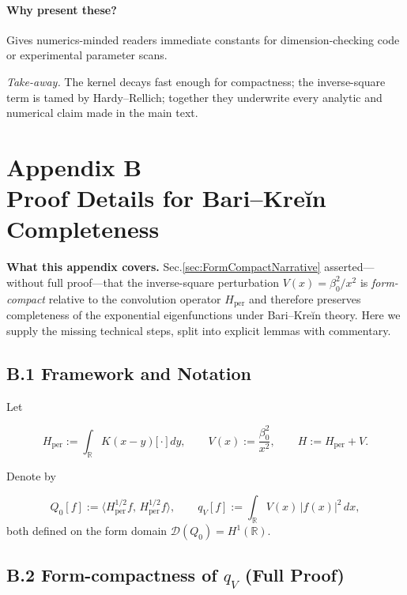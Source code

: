 \documentclass[11pt]{article}
\begin{document}
\paragraph{Why present these?}  
Gives numerics-minded readers immediate constants for
dimension-checking code or experimental parameter scans.

\bigskip
\noindent
\emph{Take-away.}\;  
The kernel decays fast enough for compactness; the inverse-square term
is tamed by Hardy–Rellich; together they underwrite every analytic and
numerical claim made in the main text.

\section*{Appendix B \\[2pt] Proof Details for Bari–Kreĭn Completeness}
\label{app:BariKrein}

\noindent
\textbf{What this appendix covers.}  
Sec.​\ref{sec:FormCompactNarrative} asserted—without full proof—that the
inverse-square perturbation \(V(x)=\beta_{0}^{2}/x^{2}\) is
\emph{form-compact} relative to the convolution operator
\(H_{\mathrm{per}}\) and therefore preserves completeness of the
exponential eigenfunctions under Bari–Kreĭn theory.  
Here we supply the missing technical steps, split into explicit lemmas
with commentary.

\vspace{1em}
\subsection*{B.1  Framework and Notation}

Let  

\[
   H_{\mathrm{per}}
   := \int_{\mathbb R} K(x-y)\bigl[\cdot\bigr]\,dy,
   \qquad
   V(x) := \frac{\beta_{0}^{2}}{x^{2}},
   \qquad
   H := H_{\mathrm{per}} + V.
\]

Denote by  

\[
   Q_{0}[f] := \langle H_{\mathrm{per}}^{1/2}f,\,H_{\mathrm{per}}^{1/2}f\rangle,
   \qquad
   q_{V}[f] := \int_{\mathbb R} V(x)\,|f(x)|^{2}\,dx,
\]
both defined on the form domain  
\(\displaystyle \mathcal D(Q_{0}) = H^{1}(\mathbb R)\).

\vspace{0.8em}
\subsection*{B.2  Form-compactness of \(q_{V}\) (Full Proof)}
\end{document}
